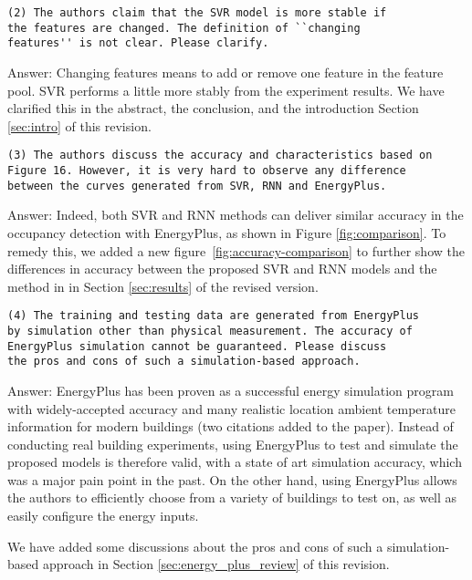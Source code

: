 \begin{verbatim}
(2) The authors claim that the SVR model is more stable if
the features are changed. The definition of ``changing
features'' is not clear. Please clarify.
\end{verbatim}

Answer: Changing features means to add or remove one feature in the
feature pool. SVR performs a little more stably from the experiment
results. We have clarified this in the abstract, the conclusion, and
the introduction Section \ref{sec:intro} of this revision.

\begin{verbatim}
(3) The authors discuss the accuracy and characteristics based on
Figure 16. However, it is very hard to observe any difference
between the curves generated from SVR, RNN and EnergyPlus.
\end{verbatim}

Answer: Indeed, both SVR and RNN methods can deliver similar accuracy
in the occupancy detection with EnergyPlus, as shown in Figure
\ref{fig:comparison}. To remedy this, we added a new figure~\ref{fig:accuracy-comparison}
to further show the differences in accuracy between the proposed SVR
and RNN models and the method in \cite{dong2014real} in Section
\ref{sec:results} of the revised version.

\begin{verbatim}
(4) The training and testing data are generated from EnergyPlus
by simulation other than physical measurement. The accuracy of
EnergyPlus simulation cannot be guaranteed. Please discuss
the pros and cons of such a simulation-based approach.
\end{verbatim}

Answer: EnergyPlus has been proven as a successful energy simulation
program with widely-accepted accuracy and many realistic location
ambient temperature information for modern buildings (two citations
added to the paper).  Instead of conducting real building experiments,
using EnergyPlus to test and simulate the proposed models is therefore
valid, with a state of art simulation accuracy, which was a major pain
point in the past. On the other hand, using EnergyPlus allows the
authors to efficiently choose from a variety of buildings to test on,
as well as easily configure the energy inputs.

We have added some discussions about the pros and cons of such a
simulation-based approach in Section \ref{sec:energy_plus_review} of
this revision.

